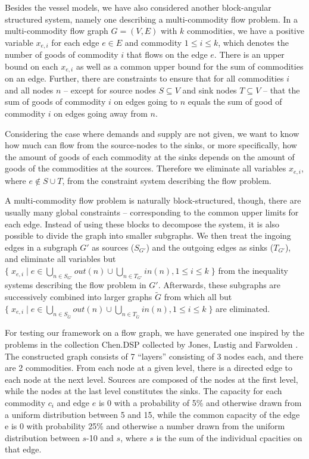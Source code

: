 Besides the vessel models, we have also considered another block-angular structured system, namely one describing a multi-commodity flow problem. In a multi-commodity flow graph $G=(V,E)$ with $k$ commodities, we have a positive variable $x_{e,i}$ for each edge $e\in E$ and commodity $1\leq i\leq k$, which denotes the number of goods of commodity $i$ that flows on the edge $e$. There is an upper bound on each $x_{e,i}$ as well as a common upper bound for the sum of commodities on an edge. Further, there are constraints to ensure that for all commodities $i$ and all nodes $n$ -- except for source nodes $S\subseteq V$ and sink nodes $T\subseteq V$ -- that the sum of goods of commodity $i$ on edges going to $n$ equals the sum of good of commodity $i$ on edges going away from $n$.

Considering the case where demands and supply are not given, we want to know how much can flow from the source-nodes to the sinks, or more specifically, how the amount of goods of each commodity at the sinks depends on the amount of goods of the commodities at the sources. Therefore we eliminate all variables $x_{e,i}$, where $e\notin S\cup T$, from the constraint system describing the flow problem.
		
A multi-commodity flow problem is naturally block-structured, though, there are usually many global constraints -- corresponding to the common upper limits for each edge. Instead of using these blocks to decompose the system, it is also possible to divide the graph into smaller subgraphs. We then treat the ingoing edges in a subgraph $G'$ as sources ($S_{G'}$) and the outgoing edges as sinks ($T_{G'}$), and eliminate all variables but $\{\;x_{e,i}\;|\; e\in \bigcup_{n\in S_{G'}}out(n)\cup \bigcup_{n\in T_{G'}}in(n), 1\leq i\leq k\;\}$ from the inequality systems describing the flow problem in $G'$. Afterwards, these  subgraphs are successively combined into larger graphs $\tilde{G}$ from which all but $\{\;x_{e,i}\;|\; e\in \bigcup_{n\in S_{\tilde G}}out(n)\cup \bigcup_{n\in T_{\tilde G}}in(n), 1\leq i\leq k\;\}$ are eliminated. 


For testing our framework on a flow graph, we have generated one inspired by the problems in the collection Chen.DSP collected by Jones, Lustig and Farwolden \cite{JLFP93}. The constructed graph consists of 7 ``layers'' consisting of 3 nodes each, and there are 2 commodities. From each node at a given level, there is a directed edge to each node at the next level. Sources are composed of the nodes at the first level, while the nodes at the last level constitutes the sinks. The capacity for each commodity $c_i$ and edge $e$ is 0 with a probability of 5\% and otherwise drawn from a uniform distribution between 5 and 15, while the common capacity of the edge e is 0 with probability 25\% and otherwise a number drawn from the uniform distribution between $s$-10 and $s$, where $s$ is the sum of the individual cpacities on that edge.

